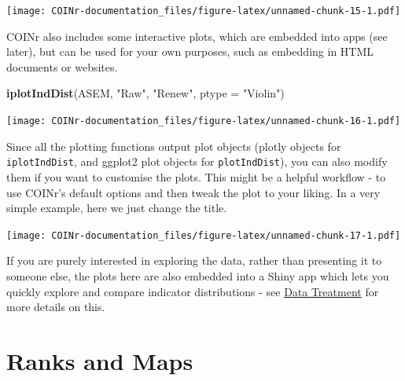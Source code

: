 \documentclass[
]{book}
\newenvironment{Shaded}{\begin{snugshade}}{\end{snugshade}}
\newcommand{\DataTypeTok}[1]{\textcolor[rgb]{0.13,0.29,0.53}{#1}}
\newcommand{\KeywordTok}[1]{\textcolor[rgb]{0.13,0.29,0.53}{\textbf{#1}}}
\newcommand{\NormalTok}[1]{#1}
\newcommand{\OperatorTok}[1]{\textcolor[rgb]{0.81,0.36,0.00}{\textbf{#1}}}
\newcommand{\StringTok}[1]{\textcolor[rgb]{0.31,0.60,0.02}{#1}}
\begin{document}
\texttt{[image: COINr-documentation\_files/figure-latex/unnamed-chunk-15-1.pdf]}

COINr also includes some interactive plots, which are embedded into apps (see later), but can be used for your own purposes, such as embedding in HTML documents or websites.

\begin{Shaded}
\begin{Highlighting}[]
\KeywordTok{iplotIndDist}\NormalTok{(ASEM, }\StringTok{"Raw"}\NormalTok{, }\StringTok{"Renew"}\NormalTok{, }\DataTypeTok{ptype =} \StringTok{"Violin"}\NormalTok{)}
\end{Highlighting}
\end{Shaded}

\texttt{[image: COINr-documentation\_files/figure-latex/unnamed-chunk-16-1.pdf]}

Since all the plotting functions output plot objects (plotly objects for \texttt{iplotIndDist}, and ggplot2 plot objects for \texttt{plotIndDist}), you can also modify them if you want to customise the plots. This might be a helpful workflow - to use COINr's default options and then tweak the plot to your liking. In a very simple example, here we just change the title.

\begin{Shaded}
\end{Shaded}

\texttt{[image: COINr-documentation\_files/figure-latex/unnamed-chunk-17-1.pdf]}

If you are purely interested in exploring the data, rather than presenting it to someone else, the plots here are also embedded into a Shiny app which lets you quickly explore and compare indicator distributions - see \protect\hyperlink{data-treatment}{Data Treatment} for more details on this.

\hypertarget{ranks-and-maps}{%
\section{Ranks and Maps}\label{ranks-and-maps}}
\end{document}
